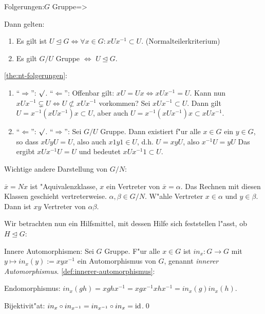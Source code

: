 \lessertheorem Folgerungen:$G$ Gruppe=>{
  \label{the:nt-folgerungen}
  Dann gelten:
  \begin{enumerate}
    \item Es gilt ist $U\unlhd G\iff \forall x\in G:xUx^{-1}\subset U$. (Normalteilerkriterium)
    \item Es gilt $G/U$ Gruppe $\iff$ $U\unlhd G$.
    \end{enumerate}
  }
\proof \ref{the:nt-folgerungen}:{
  \begin{enumerate}
    \item ``$\Rightarrow$'': $\surd$. ``$\Leftarrow$'': Offenbar gilt: $xU=Ux\iff xUx^{-1}=U$.
      Kann nun $xUx^{-1}\subsetneq U\iff U\not\subset xUx^{-1}$ vorkommen?
      Sei $xUx^{-1}\subset U$. Dann gilt $U=x^{-1}(xUx^{-1})x\subset U$, aber auch
      $U=x^{-1}(xUx^{-1})x\subset xUx^{-1}$.
    \item ``$\Leftarrow$'': $\surd$. ``$\Rightarrow$'': Sei $G/U$ Gruppe. Dann existiert
      f"ur alle $x\in G$ ein $y\in G$, so dass $xUyU=U$, also auch
      $x1y1\in U$, d.h. $U=xyU$, also $x^{-1}U=yU$
      Das ergibt $xUx^{-1}U=U$ und bedeutet $xUx^{-1}1\subset U$.
    \end{enumerate}
  }
\remark Wichtige andere Darstellung von $G/N$:{
  $\overline x=Nx$ ist "Aquivalenzklasse, $x$ ein Vertreter von
  $\overline x=\alpha$. Das Rechnen mit diesen Klassen geschieht vertreterweise.
  $\alpha,\beta\in G/N$. W"ahle Vertreter $x\in \alpha$ und $y\in\beta$. Dann ist $xy$ Vertreter
  von $\alpha\beta$.
  
  Wir betrachten nun ein Hilfsmittel, mit dessen Hilfe sich feststellen
  l"asst, ob $H\unlhd  G$:
  }
 Innere Automorphismen:{
  \label{def:innerer-automorphismus}
  Sei $G$ Gruppe.
  F"ur alle $x\in G$ ist $in_x:G\to G$ mit $y\mapsto in_x(y):=xyx^{-1}$
  ein Automorphismus von $G$, genannt \emph{innerer Automorphismus}.
  }
\proof \ref{def:innerer-automorphismus}:{
  Endomorphismus: $in_x(gh)=xghx^{-1}=xgx^{-1}xhx^{-1}=in_x(g)in_x(h)$.
  
  Bijektivit"at: $in_x\circ in_{x^{-1}}=in_{x^{-1}}\circ in_x=\operatorname{id}$.\qed
  }
